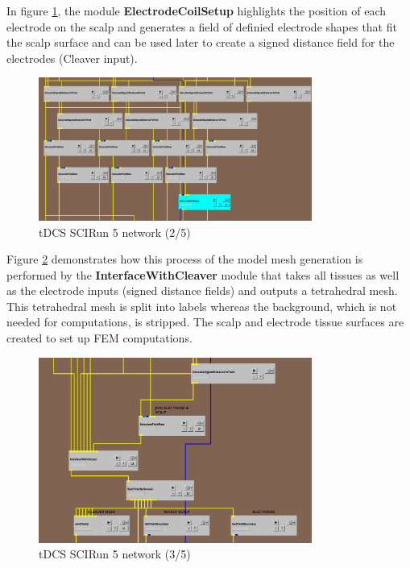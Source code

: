 \documentclass[fleqn,11pt,openany]{book}
\begin{document}
In figure \ref{fig:tdcs2}, the module \textbf{ElectrodeCoilSetup} highlights the position of each electrode on the scalp and generates a field of definied electrode 
shapes that fit the scalp surface and can be used later to create a signed distance field for the electrodes (Cleaver input). 


\begin{figure}[!h]
\centering
\includegraphics[width=0.8\textwidth]{BrainStimulation_figures/tdcs_2.png}
\caption{ tDCS SCIRun 5 network (2/5)}
\label{fig:tdcs2}
\end{figure}

Figure \ref{fig:tdcs3} demonstrates how this process of the model mesh generation is performed by the \textbf{InterfaceWithCleaver} module that takes all tissues as well as
the electrode inputs (signed distance fields) and outputs a tetrahedral mesh. This tetrahedral mesh is split into labels whereas the background,
which is not needed for computations, is stripped. The scalp and electrode tissue surfaces are created to set up FEM computations.

\begin{figure}[!h]
\centering
\includegraphics[width=0.8\textwidth]{BrainStimulation_figures/tdcs_3.png}
\caption{ tDCS SCIRun 5 network (3/5)}
\label{fig:tdcs3}
\end{figure}
\end{document}
